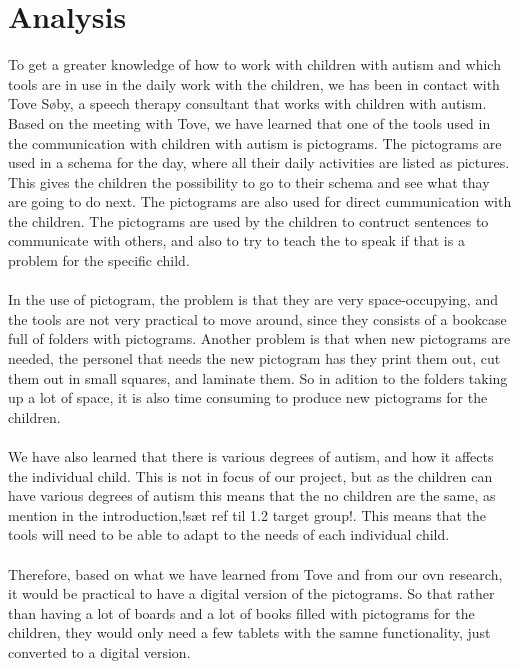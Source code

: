 \chapter{Analysis}

To get a greater knowledge of how to work with children with autism and which tools are in use in the daily work with the children, we has been in contact with  Tove S\o{}by, a speech therapy consultant that works with children with autism.\\ 

Based on the meeting with Tove, we have learned that one of the tools used in the communication with children with autism is pictograms.
The pictograms are used in a schema for the day, where all their daily activities are listed as pictures. This gives the children the possibility to go to their schema and see what thay are going to do next. The pictograms are also used for direct cummunication with the children. The pictograms are used by the children to contruct sentences to communicate with others, and also to try to teach the to speak if that is a problem for the specific child.\\
\\
In the use of pictogram, the problem is that they are very space-occupying, and the tools are not very practical to move around, since they consists of a bookcase full of folders with pictograms. Another problem is that when new pictograms are needed, the personel that needs the new pictogram has they  print them out, cut them out in small squares, and laminate them. So in adition to the folders taking up a lot of space, it is also time consuming to produce new pictograms for the children.\\ 
\\
We have also learned that there is various degrees of autism, and how it affects the individual child. This is not in focus of our project, but as the children can have various degrees of autism this means that the no children are the same, as mention in the introduction,!s\ae{}t ref til 1.2 target group!. This means that the tools will need to be able to adapt to the needs of each individual child.\\
\\ 
Therefore, based on what we have learned from Tove and from our ovn research, it would be practical to have a digital version of the pictograms. So that rather than having a lot of boards and a lot of books filled with pictograms for the children, they would only need a few tablets with the samne functionality, just converted to a digital version.
